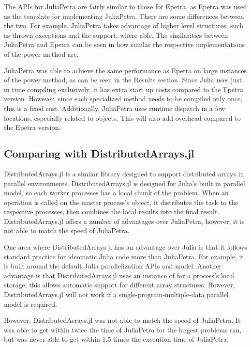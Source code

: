 \documentclass[acmsmall]{acmart}
\newcommand{\juliaSnippet}[1]{\texttt{\detokenize{#1}}}
\begin{document}
The APIs for JuliaPetra are fairly similar to those for Epetra,
as Epetra was used as the template for implementing JuliaPetra.
There are some differences between the two.
For example, JuliaPetra takes advantage of higher level structures, such as thrown exceptions and
the \juliaSnippet{AbstractArray} support, where able.
The similarities between JuliaPetra and Epetra can be seen in how similar the respective implementations
of the power method are.

JuliaPetra was able to achieve the same performance as Epetra on large instances of the power method,
as can be seen in the Results section.
Since Julia uses just in time compiling exclusively, it has extra start up costs compared to
the Epetra version. However, since each specialized method needs to be compiled only once,
this is a fixed cost.
Additionally, JuliaPetra uses runtime dispatch in a few locations, especially related to
\juliaSnippet{Comm} objects.  This will also add overhead compared to the Epetra version.

\subsection{Comparing with DistributedArrays.jl}

DistributedArrays.jl is a similar library designed to support distributed arrays in parallel environments.
\cite{DAGithub}
DistributedArrays.jl is designed for Julia's built in parallel model, so each worker processes has a
local chunk of the problem. \cite{JuliaFreshApproach}
When an operation is called on the master process's object, it distributes the task to the respective
processes, then combines the local results into the final result.
DistributedArrays.jl offers a number of advantages over JuliaPetra, however, it is not able to
match the speed of JuliaPetra.

One area where DistributedArrays.jl has an advantage over Julia is that it follows standard
practice for ideomatic Julia code more than JuliaPetra.
For example, it is built around the default Julia parallelization APIs and model.
Another advantage is that DistributedArrays.jl uses an instance of \juliaSnippet{AbstractArray}
for a process's local storage, this allows automatic support for different array structures.
However, DistributedArrays.jl will not work if a single-program-multiple-data parallel model is required.

However, DistributedArrays.jl was not able to match the speed of JuliaPetra.
It was able to get within twice the time of JuliaPetra for the largest problems ran,
but was never able to get within 1.5 times the execution time of JuliaPetra.
\end{document}
